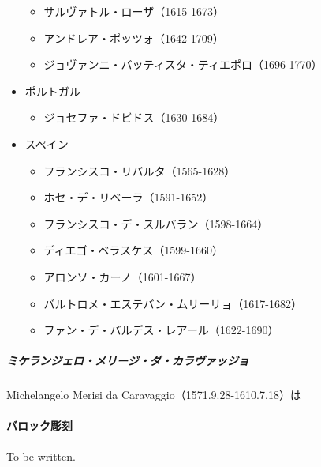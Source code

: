 \documentclass[letterpaper,10pt,dvipdfmx]{sphinxmanual}
\begin{document}
\begin{itemize}
\begin{itemize}
\item {} 
サルヴァトル・ローザ（1615-1673）

\item {} 
アンドレア・ポッツォ（1642-1709）

\item {} 
ジョヴァンニ・バッティスタ・ティエポロ（1696-1770）

\end{itemize}

\item {} 
ポルトガル
\begin{itemize}
\item {} 
ジョセファ・ドビドス（1630-1684）

\end{itemize}

\item {} 
スペイン
\begin{itemize}
\item {} 
フランシスコ・リバルタ（1565-1628）

\item {} 
ホセ・デ・リベーラ（1591-1652）

\item {} 
フランシスコ・デ・スルバラン（1598-1664）

\item {} 
ディエゴ・ベラスケス（1599-1660）

\item {} 
アロンソ・カーノ（1601-1667）

\item {} 
バルトロメ・エステバン・ムリーリョ（1617-1682）

\item {} 
ファン・デ・バルデス・レアール（1622-1690）

\end{itemize}

\end{itemize}


\subparagraph{ミケランジェロ・メリージ・ダ・カラヴァッジョ}
\label{\detokenize{Michelangelo_Merisi_da_caravaggio_1571_1610:id1}}\label{\detokenize{Michelangelo_Merisi_da_caravaggio_1571_1610::doc}}
\noindent{}

Michelangelo Merisi da Caravaggio（1571.9.28-1610.7.18）は


\paragraph{バロック彫刻}
\label{\detokenize{Baroque:id3}}
To be written.
\end{document}
